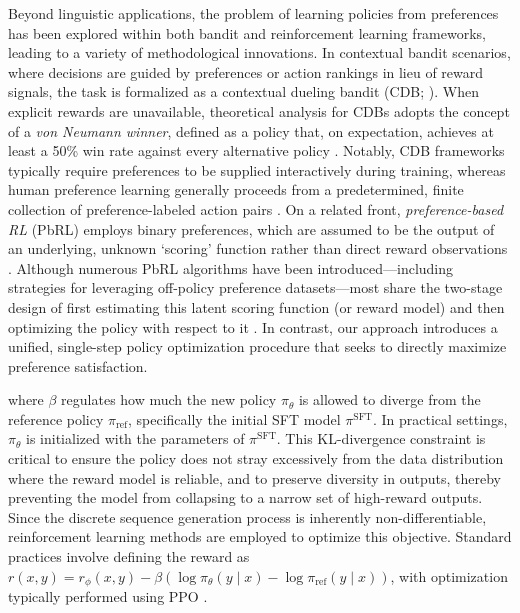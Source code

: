 Beyond linguistic applications, the problem of learning policies from preferences has been explored within both bandit and reinforcement learning frameworks, leading to a variety of methodological innovations. In contextual bandit scenarios, where decisions are guided by preferences or action rankings in lieu of reward signals, the task is formalized as a contextual dueling bandit (CDB; \cite{yue2012karmed,dudik2015contextual}). When explicit rewards are unavailable, theoretical analysis for CDBs adopts the concept of a \textit{von Neumann winner}, defined as a policy that, on expectation, achieves at least a 50\% win rate against every alternative policy \citep{dudik2015contextual}. Notably, CDB frameworks typically require preferences to be supplied interactively during training, whereas human preference learning generally proceeds from a predetermined, finite collection of preference-labeled action pairs \citep{yan2022human}. On a related front, \textit{preference-based RL} (PbRL) employs binary preferences, which are assumed to be the output of an underlying, unknown `scoring' function rather than direct reward observations \citep{BusaFekete2014,ruiz2023dueling}. Although numerous PbRL algorithms have been introduced—including strategies for leveraging off-policy preference datasets—most share the two-stage design of first estimating this latent scoring function (or reward model) and then optimizing the policy with respect to it \citep{jain2013learning,BusaFekete2014,christiano2017deep,sadigh2017active,kupcsik2018learning}. In contrast, our approach introduces a unified, single-step policy optimization procedure that seeks to directly maximize preference satisfaction.

where $\beta$ regulates how much the new policy $\pi_\theta$ is allowed to diverge from the reference policy $\pi_\text{ref}$, specifically the initial SFT model $\pi^\text{SFT}$. In practical settings, $\pi_\theta$ is initialized with the parameters of $\pi^\text{SFT}$. This KL-divergence constraint is critical to ensure the policy does not stray excessively from the data distribution where the reward model is reliable, and to preserve diversity in outputs, thereby preventing the model from collapsing to a narrow set of high-reward outputs. Since the discrete sequence generation process is inherently non-differentiable, reinforcement learning methods are employed to optimize this objective. Standard practices \citep{ziegler2020finetuning, stiennon2022learning, bai2022training, ouyang2022training} involve defining the reward as ${r(x, y) = r_{\phi}(x, y) -\beta (\log \pi_{\theta}(y\mid x) - \log \pi_\text{ref}(y\mid x))}$, with optimization typically performed using PPO \cite{schulman2017proximal}.

